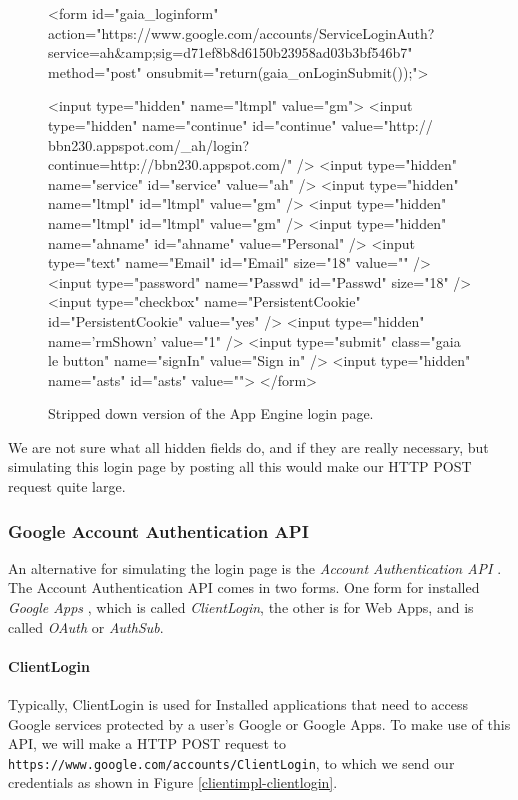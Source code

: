 \begin{figure*}[ht] %
\begin{center}
\begin{code}
<form id="gaia_loginform" 
action="https://www.google.com/accounts/ServiceLoginAuth?service=ah&amp;sig=d71ef8b8d6150b23958ad03b3bf546b7" 
  method="post"
  onsubmit="return(gaia_onLoginSubmit());">

<input type="hidden" name="ltmpl" value="gm">
<input type="hidden" name="continue" id="continue"
  value="http:// bbn230.appspot.com/_ah/login?continue=http://bbn230.appspot.com/" />
<input type="hidden" name="service" id="service" value="ah" />
<input type="hidden" name="ltmpl" id="ltmpl" value="gm" />
<input type="hidden" name="ltmpl" id="ltmpl" value="gm" />
<input type="hidden" name="ahname" id="ahname" value="Personal" />
<input type="text" name="Email"  id="Email" size="18" value="" />
<input type="password" name="Passwd" id="Passwd" size="18" />
<input type="checkbox" name="PersistentCookie" id="PersistentCookie" value="yes" />
<input type="hidden" name='rmShown' value="1" />
<input type="submit" class="gaia le button" name="signIn" value="Sign in" />
<input type="hidden" name="asts" id="asts" value="">
</form>
\end{code}
\caption{Stripped down version of the App Engine
login page.\label{clientimpl-loginform}}
\end{center}
\end{figure*}

We are not sure what all hidden fields do, and if they are really necessary, but
simulating this login page by posting all this would make our HTTP POST request
quite large.

\subsubsection{Google Account Authentication API}
An alternative for simulating the login page is the \emph{Account
Authentication API} \cite{account-auth-api}. The Account Authentication API
comes in two forms. One form for installed \emph{Google Apps}
\cite{google-apps-www}, which is called \emph{ClientLogin}, the other is for Web
Apps, and is called \emph{OAuth} or \emph{AuthSub}.

\paragraph{ClientLogin}
Typically, ClientLogin is used for Installed applications that need to access
Google services protected by a user's Google or Google Apps. To make use of this
API, we will make a HTTP POST request to
\texttt{https://www.google.com/accounts/ClientLogin}, to which we send our
credentials as shown in Figure \ref{clientimpl-clientlogin}.

